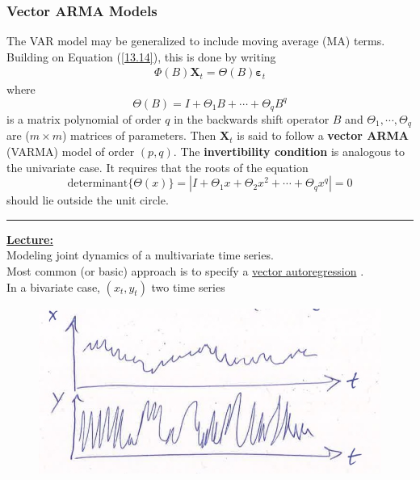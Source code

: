 \subsubsection{Vector ARMA Models}

The VAR model may be generalized to include moving average (MA) terms. Building on Equation (\ref{13.14}), this is done by writing \begin{align}
    \Phi (B) \mathbf{X}_t =\Theta(B)\mathbf{\varepsilon}_t
\end{align} where \[
\Theta(B)=I+\Theta_1 B+ \cdots + \Theta_q B^q
\] is a matrix polynomial of order $q$ in the backwards shift operator $B$ and $\Theta_1, \cdots, \Theta_q$ are ($m\times m$) matrices of parameters. Then $\mathbf{X}_t$ is said to follow a \textbf{vector ARMA} (VARMA) model of order $(p,q)$. The \textbf{invertibility condition} is analogous to the univariate case. It requires that the roots of the equation \[ 
\text{determinant}\{\Theta(x)\} =|I+\Theta_1 x + \Theta_2 x^2 + \cdots + \Theta_q x^q|=0
\] should lie outside the unit circle.
 
 \rule{\textwidth}{0.4pt}













\noindent
\textbf{\underline{Lecture:}}\\

Modeling joint dynamics of a multivariate time series.\\
\quad Most common (or basic) approach is to specify a \underline{vector autoregression} .\\

In a bivariate case, $(x_t,y_t) $ two time series
\begin{figure}[H]
    \centering
    \includegraphics[width=0.75\linewidth]{images/Screenshot 2024-05-21 at 18.18.51.jpg}
\end{figure}


